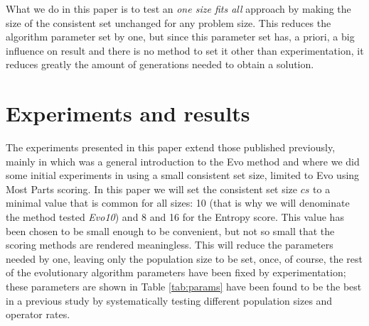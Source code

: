 \documentclass[conference]{IEEEtran}
\begin{document}
What we do in this paper is to test an {\em one size fits all} 
approach by making the size of the consistent set unchanged for any problem
size. This reduces the algorithm parameter set by one, but since this
parameter set has, a priori, a big influence on result and there is no
method to set it other than experimentation, it reduces greatly the
amount of generations needed to obtain a solution. 

\section{Experiments and results}
\label{sec:exp}

The experiments presented in this paper extend those published
previously, mainly in \cite{DBLP:conf/cec/GuervosMC11} which
was a general introduction to the Evo method and
\cite{merelo12:gameon} where we did some initial experiments in using
a small consistent set size, limited to Evo using Most Parts scoring. 
In this paper we will set the consistent set size $cs$
to a minimal value that is common for all sizes: 10 (that is why we will
denominate the method tested {\em Evo10}) and 8 and 16 for the
Entropy score. 
This value has been chosen to be small enough to be convenient, but not so small that the scoring methods are rendered meaningless. This will reduce the parameters
needed by one, leaving only the population size to be set, once, of
course, the rest of the evolutionary algorithm parameters have been
fixed by experimentation; these parameters are shown 
in Table \ref{tab:params} 
have been found to be the best in a previous
study by systematically testing different population sizes and
operator rates.  
\end{document}
